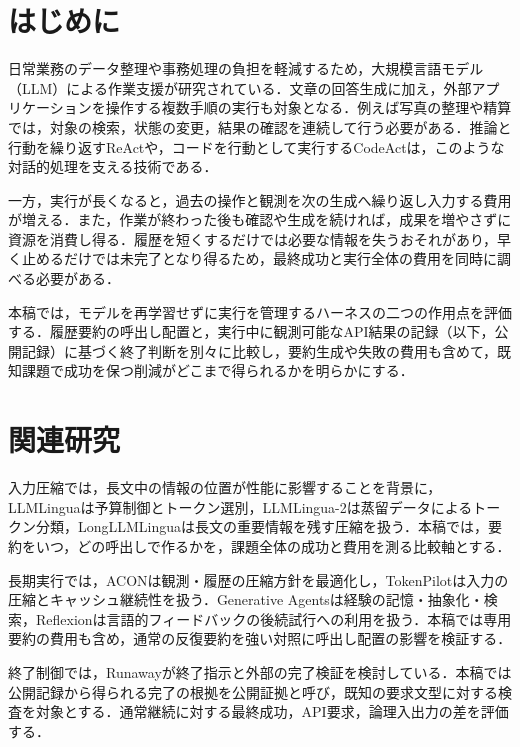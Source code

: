 \documentclass[letter]{ieicej}
\begin{document}
\maketitle


\section{はじめに}
日常業務のデータ整理や事務処理の負担を軽減するため，大規模言語モデル（LLM）による作業支援が研究されている．文章の回答生成に加え，外部アプリケーションを操作する複数手順の実行も対象となる．例えば写真の整理や精算では，対象の検索，状態の変更，結果の確認を連続して行う必要がある．推論と行動を繰り返すReAct\cite{yao2023react}や，コードを行動として実行するCodeAct\cite{wang2024codeact}は，このような対話的処理を支える技術である．

一方，実行が長くなると，過去の操作と観測を次の生成へ繰り返し入力する費用が増える．また，作業が終わった後も確認や生成を続ければ，成果を増やさずに資源を消費し得る．履歴を短くするだけでは必要な情報を失うおそれがあり，早く止めるだけでは未完了となり得るため，最終成功と実行全体の費用を同時に調べる必要がある．

本稿では，モデルを再学習せずに実行を管理するハーネスの二つの作用点を評価する．履歴要約の呼出し配置と，実行中に観測可能なAPI結果の記録（以下，公開記録）に基づく終了判断を別々に比較し，要約生成や失敗の費用も含めて，既知課題で成功を保つ削減がどこまで得られるかを明らかにする．

\section{関連研究}
入力圧縮では，長文中の情報の位置が性能に影響すること\cite{liu2024lost}を背景に，LLMLingua\cite{jiang2023llmlingua}は予算制御とトークン選別，LLMLingua-2\cite{pan2024llmlingua2}は蒸留データによるトークン分類，LongLLMLingua\cite{jiang2024longllmlingua}は長文の重要情報を残す圧縮を扱う．本稿では，要約をいつ，どの呼出しで作るかを，課題全体の成功と費用を測る比較軸とする．

長期実行では，ACON\cite{kang2026acon}は観測・履歴の圧縮方針を最適化し，TokenPilot\cite{xu2026tokenpilot}は入力の圧縮とキャッシュ継続性を扱う．Generative Agents\cite{park2023generative}は経験の記憶・抽象化・検索，Reflexion\cite{shinn2023reflexion}は言語的フィードバックの後続試行への利用を扱う．本稿では専用要約の費用も含め，通常の反復要約を強い対照に呼出し配置の影響を検証する．

終了制御では，Runaway\cite{lu2025runaway}が終了指示と外部の完了検証を検討している．本稿では公開記録から得られる完了の根拠を公開証拠と呼び，既知の要求文型に対する検査を対象とする．通常継続に対する最終成功，API要求，論理入出力の差を評価する．
\end{document}
